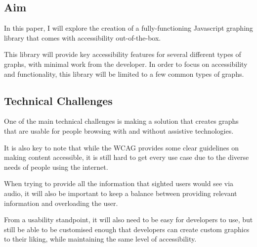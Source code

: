 \documentclass[ %
                    author={Aleena Baig},
                supervisor={Dr Simon Lock},
                    degree={BSc},
                     title={On Making Web Accessible Graphs},
                  subtitle={},
                      year={2019} ]{dissertation}
\begin{document}

\subsection{Aim}

In this paper, I will explore the creation of a fully-functioning Javascript graphing library that comes with accessibility out-of-the-box.

This library will provide key accessibility features for several different types of graphs, with minimal work from the developer. In order to focus on accessibility and functionality, this library will be limited to a few common types of graphs.


\subsection{Technical Challenges}

One of the main technical challenges is making a solution that creates graphs that are usable for people browsing with and without assistive technologies.

It is also key to note that while the WCAG provides some clear guidelines on making content accessible, it is still hard to get every use case due to the diverse needs of people using the internet.

When trying to provide all the information that sighted users would see via audio, it will also be important to keep a balance between providing relevant information and overloading the user.

From a usability standpoint, it will also need to be easy for developers to use, but still be able to be customised enough that developers can create custom graphics to their liking, while maintaining the same level of accessibility.

\end{document}
